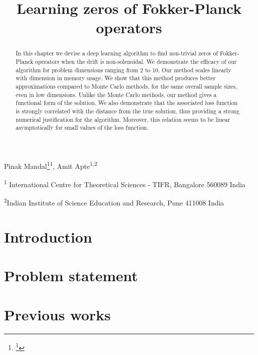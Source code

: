 \documentclass[reqno,review]{siamart}
\title{Learning zeros of Fokker-Planck operators}
\makeatletter
\newcommand{\authorfootnotes}{\renewcommand\thefootnote{\@fnsymbol\c@footnote}}%
\makeatother
\begin{document}
\maketitle

 {\normalsize
 \centering
  \authorfootnotes
  Pinak Mandal\footnote{\thanks{Corresponding author: \texttt{pinak.mandal@icts.res.in}}}\textsuperscript{1}, Amit Apte\textsuperscript{1,2}

  \textsuperscript{1} International Centre for Theoretical Sciences - TIFR, Bangalore 560089 India \par
  \textsuperscript{2}Indian Institute of Science Education and Research, Pune 411008 India\par \bigskip}

\begin{abstract}
In this chapter we devise a deep learning algorithm to find non-trivial zeros of Fokker-Planck operators when the drift is non-solenoidal. We demonstrate the efficacy of our algorithm for problem dimensions ranging from 2 to 10. Our method scales linearly with dimension in memory usage. We show that this method produces better approximations compared to Monte Carlo methods, for the same overall sample sizes, even in low dimensions. Unlike the Monte Carlo methods, our method gives a functional form of the solution. We also demonstrate that the associated loss function is strongly correlated with the distance from the true solution, thus providing a strong numerical justification for the algorithm. Moreover, this relation seems to be linear asymptotically for small values of the loss function.
\end{abstract}




\section{Introduction}\label{sec-intro--steady-fp}

\section{Problem statement}
\label{sec-prob--steady-fp}

\section{Previous works}\label{sec-prev-work--steady-fp}
\end{document}
